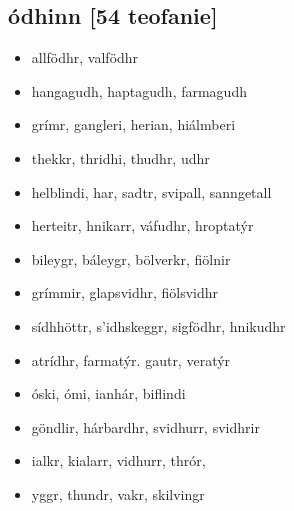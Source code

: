\documentclass[danish,a4paper,12pt]{article}
\begin{document}
\subsection*{ódhinn [54 teofanie]}
\begin{itemize}
  \item[] allfödhr, valfödhr
  \item[] hangagudh, haptagudh, farmagudh
  \item[] grímr, gangleri, herian, hiálmberi
  \item[] thekkr, thridhi, thudhr, udhr
  \item[] helblindi, har, sadtr, svipall, sanngetall
  \item[] herteitr, hnikarr, váfudhr, hroptatýr
  \item[] bileygr, báleygr, bölverkr, fiölnir
  \item[] grímmir, glapsvidhr, fiölsvidhr
  \item[] sídhhöttr, s'idhskeggr, sigfödhr, hnikudhr
  \item[] atrídhr, farmatýr. gautr, veratýr
  \item[] óski, ómi, ianhár, biflindi
  \item[] göndlir, hárbardhr, svidhurr, svidhrir
  \item[] ialkr, kialarr, vidhurr, thrór,
  \item[] yggr, thundr, vakr, skilvingr 
\end{itemize}
\end{document}
